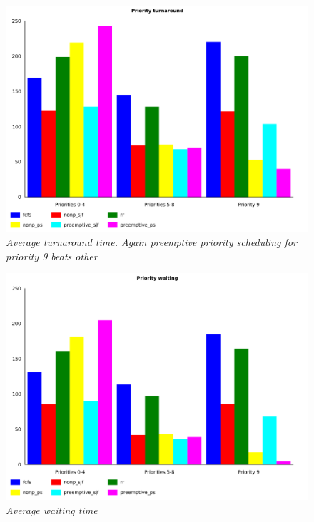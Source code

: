 \documentclass{article}
\begin{document}
\begin{figure}[ht]
\centerline{\includegraphics[scale=1]{priority_turnaround_averages}}
\caption{{\it Average turnaround time. Again preemptive priority scheduling for priority 9 beats other}}  
\label{surf}
\end{figure}
\begin{figure}[ht]
\centerline{\includegraphics[scale=1]{priority_waiting_averages}}
\caption{{\it Average waiting time}}  
\label{surf}
\end{figure}
\end{document}
